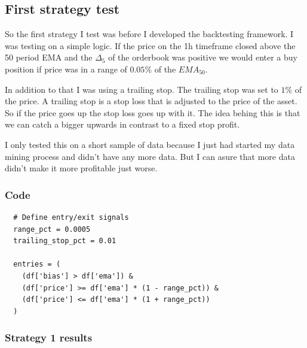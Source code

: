 \documentclass[12pt]{article}
\begin{document}
\subsection{First strategy test}
So the first strategy I test was before I developed the backtesting framework. I was testing on a simple logic. If the price on the 1h timeframe closed above the 50 period EMA and the $\Delta_5$ of the orderbook was positive we would enter a buy position if price was in a range of $0.05\%$ of the $EMA_50$.


In addition to that I was using a trailing stop. The trailing stop was set to $1\%$ of the price.
A trailing stop is a stop loss that is adjusted to the price of the asset. So if the price goes up the stop loss goes up with it. The idea behing this is that we can catch a bigger upwards in contrast to a fixed stop profit.

I only tested this on a short sample of data because I just had started my data mining process and didn't have any more data. But I can asure that more data didn't make it more profitable just worse.


\subsubsection{Code}

\begin{verbatim}
  # Define entry/exit signals
  range_pct = 0.0005
  trailing_stop_pct = 0.01

  entries = (
    (df['bias'] > df['ema']) &
    (df['price'] >= df['ema'] * (1 - range_pct)) &
    (df['price'] <= df['ema'] * (1 + range_pct))
  )

\end{verbatim}

\subsubsection{Strategy 1 results}
\end{document}
